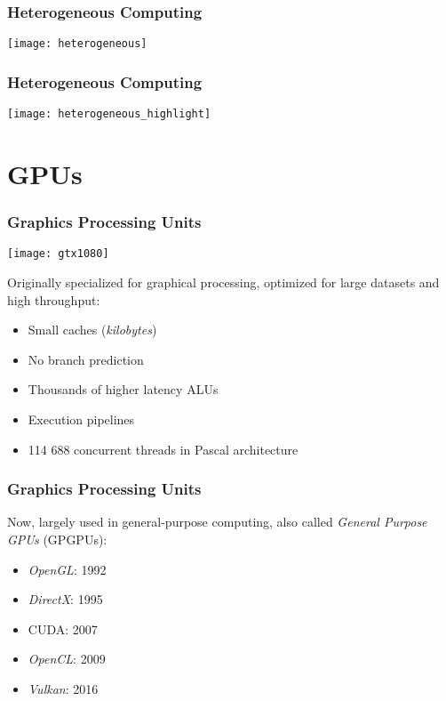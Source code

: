 \documentclass[10pt, compress]{beamer}
\begin{document}
\begin{frame}
    \frametitle{Heterogeneous Computing}
    \centering
    \texttt{[image: heterogeneous]}
\end{frame}

\begin{frame}
    \frametitle{Heterogeneous Computing}
    \centering
    \texttt{[image: heterogeneous\_highlight]}
\end{frame}

\section{GPUs}

\begin{frame}
    \frametitle{Graphics Processing Units}
    \begin{center}
        \texttt{[image: gtx1080]}
    \end{center}
    \pause

    Originally specialized for \alert{graphical processing},
    optimized for large datasets and \alert{high throughput}:
    \pause

    \begin{itemize}
        \item Small caches (\textit{kilobytes})
            \pause
        \item No \alert{branch prediction}
            \pause
        \item Thousands of \alert{higher latency} ALUs
            \pause
        \item Execution \alert{pipelines}
            \pause
        \item 114 688 concurrent \alert{threads} in Pascal architecture
    \end{itemize}
\end{frame}

\begin{frame}
    \frametitle{Graphics Processing Units}
    Now, largely used in general-purpose computing,
    also called \textit{General Purpose GPUs} (GPGPUs):
    \pause
    \begin{itemize}
        \item \textit{OpenGL}: 1992
        \item \textit{DirectX}: 1995
        \item \alert{CUDA}: 2007
        \item \textit{OpenCL}: 2009
        \item \textit{Vulkan}: 2016
    \end{itemize}
\end{frame}
\end{document}
